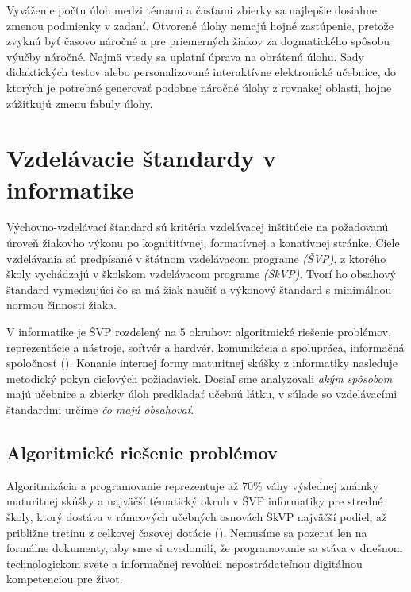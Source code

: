 Vyváženie počtu úloh medzi témami a časťami zbierky sa najlepšie dosiahne zmenou podmienky v zadaní. Otvorené úlohy nemajú hojné zastúpenie, pretože zvyknú byť časovo náročné a pre priemerných žiakov za dogmatického spôsobu výučby náročné. Najmä vtedy sa uplatní úprava na obrátenú úlohu. Sady didaktických testov alebo personalizované interaktívne elektronické učebnice, do ktorých je potrebné generovať podobne náročné úlohy z rovnakej oblasti, hojne zúžitkujú zmenu fabuly úlohy.

\section{Vzdelávacie štandardy v informatike}
Výchovno-vzdelávací štandard sú kritéria vzdelávacej inštitúcie na požadovanú úroveň žiakovho výkonu po kognititívnej, formatívnej a konatívnej stránke. Ciele vzdelávania sú predpísané v štátnom vzdelávacom programe \emph{(ŠVP)}, z ktorého školy vychádzajú v školskom vzdelávacom programe \emph{(ŠkVP)}. Tvorí ho obsahový štandard vymedzujúci čo sa má žiak naučiť a výkonový štandard s minimálnou normou činnosti žiaka.

V informatike je ŠVP rozdelený na 5 okruhov: algoritmické riešenie problémov, reprezentácie a nástroje, softvér a hardvér, komunikácia a spolupráca, informačná spoločnosť (\cite{statny_2023}). Konanie internej formy maturitnej skúšky z informatiky nasleduje metodický pokyn cieľových požiadaviek. Dosiaľ sme analyzovali \emph{akým spôsobom} majú učebnice a zbierky úloh predkladať učebnú látku, v súlade so vzdelávacími štandardmi určíme \emph{čo majú obsahovať}.

\subsection{Algoritmické riešenie problémov}
Algoritmizácia a programovanie reprezentuje až 70\% váhy výslednej známky maturitnej skúšky a najväčší tématický okruh v ŠVP informatiky pre stredné školy, ktorý dostáva v rámcových učebných osnovách ŠkVP najväčší podiel, až približne tretinu z celkovej časovej dotácie (\cite{cp_2023}). Nemusíme sa pozerať len na formálne dokumenty, aby sme si uvedomili, že programovanie sa stáva v dnešnom technologickom svete a informačnej revolúcii nepostrádateľnou digitálnou kompetenciou pre život.

